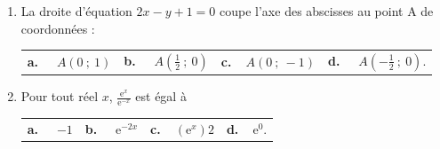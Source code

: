 \documentclass[10pt]{article}
\providecommand{\e}{{\mathrm{e}}}
\begin{document}
\begin{enumerate}
\item La droite d'équation $2x - y + 1 = 0$ coupe l'axe des abscisses au point A de
coordonnées :

\begin{center}
\begin{tabularx}{\linewidth}{*{4}{X}}
\textbf{a.~~} $A(0~;~1)$ &\textbf{b.~~} $A\left(\frac{1}{2}~;~0\right)$&\textbf{c.~~}$A(0~;~- 1)$& \textbf{d.~~} $A(-\frac{1}{2}~;~0)$.
\end{tabularx}
\end{center}

\item Pour tout réel $x$, $\frac{\e^x}{ \e^{-x}}$ est égal à

\begin{center}
\begin{tabularx}{\linewidth}{*{4}{X}}
\textbf{a.~~} $- 1$ &\textbf{b.~~} $ \e^{-2x}$&\textbf{c.~~}$(\e^x)2$& \textbf{d.~~}$\e^0$.
\end{tabularx}
\end{center}
\end{enumerate}

\vspace{0,5cm}
\end{document}

